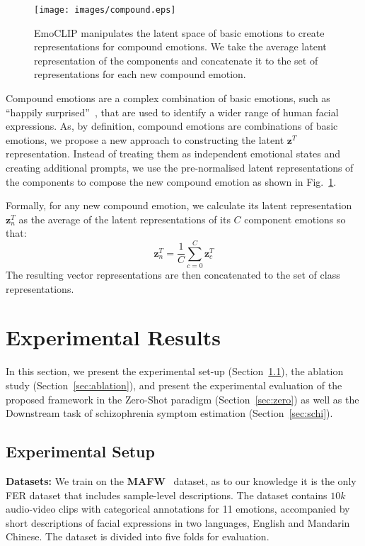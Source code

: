 \documentclass[10pt,twocolumn,letterpaper]{article}
\begin{document}
\label{sec:compound}
\begin{figure}
  \begin{center}
    \texttt{[image: images/compound.eps]}
  \end{center}
    \caption{EmoCLIP manipulates the latent space of basic emotions to create representations for compound emotions. We take the average latent representation of the components and concatenate it to the set of representations for each new compound emotion.}
  \label{fig:compound}
\end{figure}

Compound emotions are a complex combination of basic emotions, such as ``happily surprised''~\cite{cowen_self-report_2017, liu_mafw_2022}, that are used to identify a wider range of human facial expressions. As, by definition, compound emotions are combinations of basic emotions, we propose a new approach to constructing the latent $\textbf{z}^T$ representation. Instead of treating them as independent emotional states and creating additional prompts, we use the pre-normalised latent representations of the components to compose the new compound emotion as shown in Fig.~\ref{fig:compound}. 

Formally, for any new compound emotion, we calculate its latent representation $\textbf{z}_n^T$ as the average of the latent representations of its $C$ component emotions so that: 
\begin{equation}
 \textbf{z}_n^T = \frac{1}{C} \sum_{c=0}^C \textbf{z}_c^T    
\end{equation}
The resulting vector representations are then concatenated to the set of class representations.



\section{Experimental Results}
\label{sec:res}

In this section, we present the experimental set-up (Section~\ref{sec:setup}), the ablation study (Section~\ref{sec:ablation}), and present the experimental evaluation of the proposed framework in the Zero-Shot paradigm (Section~\ref{sec:zero}) as well as the Downstream task of schizophrenia symptom estimation (Section~\ref{sec:schi}).


\subsection{Experimental Setup}
\label{sec:setup}
\textbf{Datasets:} We train on the \textbf{MAFW}~\cite{liu_mafw_2022} dataset, as to our knowledge it is the only FER dataset that includes sample-level descriptions. The dataset contains $10k$ audio-video clips with categorical annotations for 11 emotions, accompanied by short descriptions of facial expressions in two languages, English and Mandarin Chinese. The dataset is divided into five folds for evaluation. 
\end{document}
